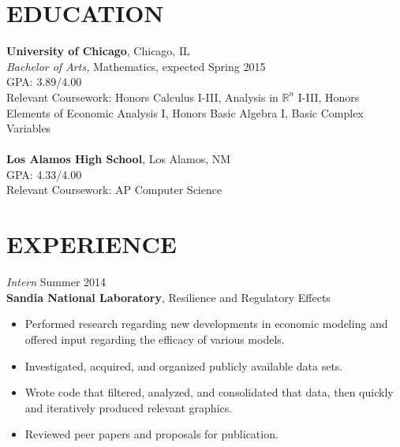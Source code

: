 \documentclass[margin, 10pt]{res} %
\begin{document}
\begin{resume}

% 
%


\section{EDUCATION}

\textbf{University of Chicago}, Chicago, IL \\
{\sl Bachelor of Arts,} Mathematics, expected Spring 2015 \\
GPA: 3.89/4.00 \\
Relevant Coursework: Honors Calculus I-III, Analysis in $\mathbb{R}^n$ I-III, Honors Elements of Economic Analysis I, Honors Basic Algebra I, Basic Complex Variables \\\\
\textbf{Los Alamos High School}, Los Alamos, NM \\
GPA: 4.33/4.00 \\
Relevant Coursework: AP Computer Science
 
 
\section{EXPERIENCE}

{\sl Intern} \hfill Summer 2014 \\
\textbf{Sandia National Laboratory}, Resilience and Regulatory Effects

\begin{itemize} \itemsep -2pt %
\item Performed research regarding new developments in economic modeling and offered input regarding the efficacy of various models. 
\item Investigated, acquired, and organized publicly available data sets. 
\item Wrote code that filtered, analyzed, and consolidated that data, then quickly and iteratively produced relevant graphics. 
\item Reviewed peer papers and proposals for publication. 
\end{itemize}
 

\end{resume}
\end{document}
